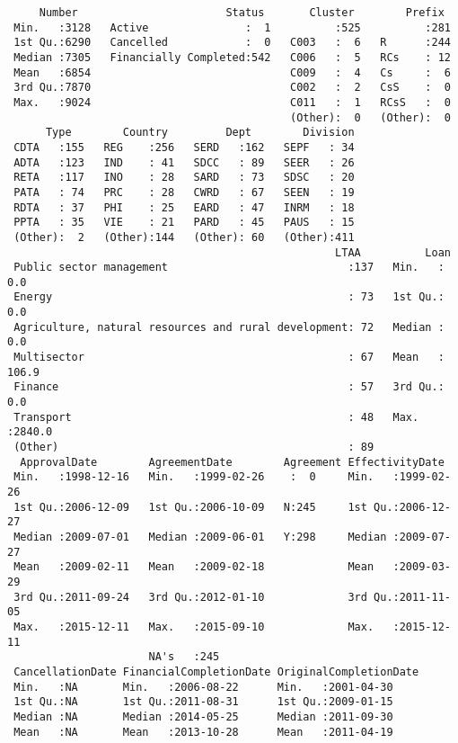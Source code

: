 \documentclass[11pt]{article}
\begin{document}
    
    \begin{verbatim}
     Number                       Status       Cluster        Prefix   
 Min.   :3128   Active               :  1          :525          :281  
 1st Qu.:6290   Cancelled            :  0   C003   :  6   R      :244  
 Median :7305   Financially Completed:542   C006   :  5   RCs    : 12  
 Mean   :6854                               C009   :  4   Cs     :  6  
 3rd Qu.:7870                               C002   :  2   CsS    :  0  
 Max.   :9024                               C011   :  1   RCsS   :  0  
                                            (Other):  0   (Other):  0  
      Type        Country         Dept        Division  
 CDTA   :155   REG    :256   SERD   :162   SEPF   : 34  
 ADTA   :123   IND    : 41   SDCC   : 89   SEER   : 26  
 RETA   :117   INO    : 28   SARD   : 73   SDSC   : 20  
 PATA   : 74   PRC    : 28   CWRD   : 67   SEEN   : 19  
 RDTA   : 37   PHI    : 25   EARD   : 47   INRM   : 18  
 PPTA   : 35   VIE    : 21   PARD   : 45   PAUS   : 15  
 (Other):  2   (Other):144   (Other): 60   (Other):411  
                                                   LTAA          Loan       
 Public sector management                            :137   Min.   :   0.0  
 Energy                                              : 73   1st Qu.:   0.0  
 Agriculture, natural resources and rural development: 72   Median :   0.0  
 Multisector                                         : 67   Mean   : 106.9  
 Finance                                             : 57   3rd Qu.:   0.0  
 Transport                                           : 48   Max.   :2840.0  
 (Other)                                             : 89                   
  ApprovalDate        AgreementDate        Agreement EffectivityDate     
 Min.   :1998-12-16   Min.   :1999-02-26    :  0     Min.   :1999-02-26  
 1st Qu.:2006-12-09   1st Qu.:2006-10-09   N:245     1st Qu.:2006-12-27  
 Median :2009-07-01   Median :2009-06-01   Y:298     Median :2009-07-27  
 Mean   :2009-02-11   Mean   :2009-02-18             Mean   :2009-03-29  
 3rd Qu.:2011-09-24   3rd Qu.:2012-01-10             3rd Qu.:2011-11-05  
 Max.   :2015-12-11   Max.   :2015-09-10             Max.   :2015-12-11  
                      NA's   :245                                        
 CancellationDate FinancialCompletionDate OriginalCompletionDate
 Min.   :NA       Min.   :2006-08-22      Min.   :2001-04-30    
 1st Qu.:NA       1st Qu.:2011-08-31      1st Qu.:2009-01-15    
 Median :NA       Median :2014-05-25      Median :2011-09-30    
 Mean   :NA       Mean   :2013-10-28      Mean   :2011-04-19    

\end{verbatim}
\end{document}
